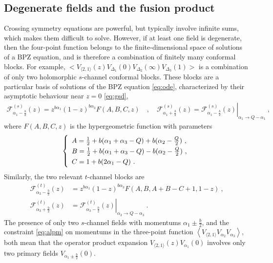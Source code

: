 \documentclass[12pt, a4paper]{article}
\theoremstyle{break}
\begin{document}
\subsection{Degenerate fields and the fusion product}

Crossing symmetry equations are powerful, but typically involve infinite sums, which makes them difficult to solve.
However, if at least one field is degenerate, then the four-point function belongs to the finite-dimensional space of solutions of a BPZ equation, and is therefore a combination of finitely many conformal blocks. 
For example,
$\Big< V_{\langle 2, 1 \rangle}(z) V_{\Delta_1}(0)V_{\Delta_2}(\infty)V_{\Delta_3}(1) \Big>$ is a combination of only two holomorphic $s$-channel conformal blocks.
These blocks are a particular basis of solutions of the BPZ equation \eqref{eq:ode}, characterized by their asymptotic behaviour near $z=0$ \eqref{eq:gsd}, 
\begin{align}
\mathcal{F}^{(s)}_{\alpha_1-\frac{b}{2}}(z) = z^{b\alpha_1} (1-z)^{b\alpha_3} F(A,B,C,z)\quad , \quad 
 \mathcal{F}^{(s)}_{\alpha_1+\frac{b}{2}}(z) = \left. \mathcal{F}^{(s)}_{\alpha_1-\frac{b}{2}}(z) \right|_{\alpha_1\to Q-\alpha_1} \ ,
\label{gpm}
\end{align}
where $F(A,B,C,z)$ is the hypergeometric function with parameters
\begin{align}
\renewcommand{\arraystretch}{1.3}
\left\{\begin{array}{l}   A = \frac12 + b(\alpha_1+\alpha_3-Q) + b(\alpha_2-\tfrac{Q}{2}) \ , \\
      B = \frac12 + b(\alpha_1+\alpha_3-Q) - b(\alpha_2-\tfrac{Q}{2}) \ , \\
      C = 1 + b(2\alpha_1-Q) \ .
\end{array}\right. 
\label{abc}
\end{align}
Similarly, the two relevant $t$-channel blocks are 
\begin{align}
 \mathcal{F}^{(t)}_{\alpha_3-\frac{b}{2}}(z) &= z^{b\alpha_1} (1-z)^{b\alpha_3} F(A,B,A+B-C+1,1-z)\ ,
 \nonumber \\
 \mathcal{F}^{(t)}_{\alpha_3+\frac{b}{2}}(z) &= \left. \mathcal{F}^{(t)}_{\alpha_3-\frac{b}{2}}(z) \right|_{\alpha_3\to Q-\alpha_3} \ .
\end{align}
The presence of only two $s$-channel fields with momentums $\alpha_1\pm \frac{b}{2}$, and the constraint \eqref{eq:alpm} on momentums in the three-point function $\left<V_{\langle 2,1\rangle}V_{\alpha_2}V_{\alpha_3}\right>$, both mean that the operator product expansion $V_{\langle 2, 1 \rangle}(z) V_{\alpha_1}(0)$ involves only two primary fields $V_{\alpha_1\pm \frac{b}{2}}(0)$. 
\end{document}
